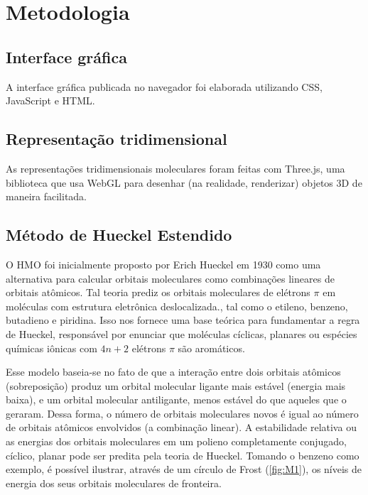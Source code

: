 \chapter{Metodologia
}\label{cap:desenvolvimento}
\section{Interface gráfica}

A interface gráfica publicada no navegador foi elaborada utilizando CSS, JavaScript e HTML. 

\section{Representação tridimensional}

As representações tridimensionais moleculares foram feitas com Three.js, uma biblioteca que usa WebGL para desenhar (na realidade, renderizar) objetos 3D de maneira facilitada. 

\section{Método de Hueckel Estendido}

O \gls{HMO} foi inicialmente proposto por Erich Hueckel em 1930 \autocite{Hckel1931} como uma alternativa para calcular orbitais moleculares como combinações lineares de orbitais atômicos\autocite{Coulson1978-ot}. Tal teoria prediz os orbitais moleculares de elétrons $\pi$ em moléculas com estrutura eletrônica deslocalizada., tal como o etileno, benzeno, butadieno e piridina. Isso nos fornece uma base teórica para fundamentar a regra de Hueckel, responsável por enunciar que moléculas cíclicas, planares ou espécies químicas iônicas com $4n + 2$ elétrons $\pi$ são aromáticos.

Esse modelo baseia-se no fato de que a interação entre dois orbitais atômicos (sobreposição) produz um orbital molecular ligante mais estável (energia mais baixa), e um orbital molecular antiligante, menos estável do que aqueles que o geraram. Dessa forma, o número de orbitais moleculares novos é igual ao número de orbitais atômicos envolvidos (a combinação linear). A estabilidade relativa ou as energias dos orbitais moleculares em um polieno completamente conjugado, cíclico, planar pode ser predita pela teoria de Hueckel. Tomando o benzeno como exemplo, é possível ilustrar, através de um círculo de Frost (\autoref{fig:M1}), os níveis de energia dos seus orbitais moleculares de fronteira.

